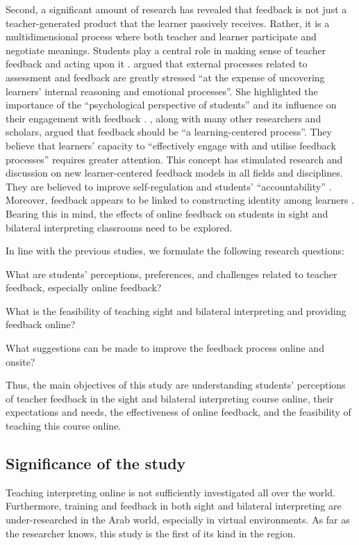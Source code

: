 \documentclass[english]{textolivre}
\begin{document}
Second, a significant amount of research has revealed that feedback is not just a teacher-generated product that the learner passively receives. Rather, it is a multidimensional process where both teacher and learner participate and negotiate meanings. Students play a central role in making sense of teacher feedback \cite[p. 1315]{carless_development_2018} and acting upon it \cite[p. 1406]{henderson_conditions_2019}. \textcite[p. 793]{leighton_students_2019} argued that external processes related to assessment and feedback are greatly stressed “at the expense of uncovering learners’ internal reasoning and emotional processes”. She highlighted the importance of the “psychological perspective of students” and its influence on their engagement with feedback \cite[p. 803]{leighton_students_2019}. \textcite[p. 528]{molloy_developing_2020}, along with many other researchers and scholars, argued that feedback should be “a learning-centered process”. They believe that learners’ capacity to “effectively engage with and utilise feedback processes” requires greater attention. This concept has stimulated research and discussion on new learner-centered feedback models in all fields and disciplines. They are believed to improve self-regulation \cite{ogange_student_2018,raymond_impact_2019} and students’ “accountability” \cite{raymond_impact_2019}. Moreover, feedback appears to be linked to constructing identity among learners \cite[p. 3]{torres_interpreting_2016}. Bearing this in mind, the effects of online feedback on students in sight and bilateral interpreting classrooms need to be explored.

In line with the previous studies, we formulate the following research questions:

What are students’ perceptions, preferences, and challenges related to teacher feedback, especially online feedback?

What is the feasibility of teaching sight and bilateral interpreting and providing feedback online?

What suggestions can be made to improve the feedback process online and onsite?

Thus, the main objectives of this study are understanding students’ perceptions of teacher feedback in the sight and bilateral interpreting course online, their expectations and needs, the effectiveness of online feedback, and the feasibility of teaching this course online.  


\subsection{Significance of the study}
Teaching interpreting online is not sufficiently investigated all over the world. Furthermore, training and feedback in both sight and bilateral interpreting are under-researched in the Arab world, especially in virtual environments. As far as the researcher knows, this study is the first of its kind in the region.
\end{document}
